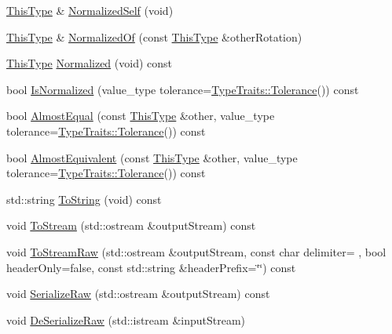 \begin{DoxyCompactItemize}
\hyperlink{classvct_axis_angle_rotation3_af654a8037b7b82a378f69cb1bfd9b8dd}{This\+Type} \& \hyperlink{classvct_axis_angle_rotation3_a37ddf9e48a259ffbf6f1beddcadf2aed}{Normalized\+Self} (void)
\item 
\hyperlink{classvct_axis_angle_rotation3_af654a8037b7b82a378f69cb1bfd9b8dd}{This\+Type} \& \hyperlink{classvct_axis_angle_rotation3_a9ab57a20a5831e8a46abf161e89d9e05}{Normalized\+Of} (const \hyperlink{classvct_axis_angle_rotation3_af654a8037b7b82a378f69cb1bfd9b8dd}{This\+Type} \&other\+Rotation)
\item 
\hyperlink{classvct_axis_angle_rotation3_af654a8037b7b82a378f69cb1bfd9b8dd}{This\+Type} \hyperlink{classvct_axis_angle_rotation3_a116569ba3bfefa865eaa77f47e437a4f}{Normalized} (void) const 
\item 
bool \hyperlink{classvct_axis_angle_rotation3_a8ce58b2c95cf2abbb6e4244c5837f46d}{Is\+Normalized} (value\+\_\+type tolerance=\hyperlink{classcmn_type_traits_adc129bf9867295b90d300768b780fa99}{Type\+Traits\+::\+Tolerance}()) const 
\item 
bool \hyperlink{classvct_axis_angle_rotation3_a1551351754cb3255404e61e04828d5e0}{Almost\+Equal} (const \hyperlink{classvct_axis_angle_rotation3_af654a8037b7b82a378f69cb1bfd9b8dd}{This\+Type} \&other, value\+\_\+type tolerance=\hyperlink{classcmn_type_traits_adc129bf9867295b90d300768b780fa99}{Type\+Traits\+::\+Tolerance}()) const 
\item 
bool \hyperlink{classvct_axis_angle_rotation3_af333432bd09bebbce7334e23d9e0d637}{Almost\+Equivalent} (const \hyperlink{classvct_axis_angle_rotation3_af654a8037b7b82a378f69cb1bfd9b8dd}{This\+Type} \&other, value\+\_\+type tolerance=\hyperlink{classcmn_type_traits_adc129bf9867295b90d300768b780fa99}{Type\+Traits\+::\+Tolerance}()) const 
\item 
std\+::string \hyperlink{classvct_axis_angle_rotation3_a21face93472a7d62f8f9065d609cfe32}{To\+String} (void) const 
\item 
void \hyperlink{classvct_axis_angle_rotation3_acbda7447118bc35acbb77b0de1c4cfa7}{To\+Stream} (std\+::ostream \&output\+Stream) const 
\item 
void \hyperlink{classvct_axis_angle_rotation3_a19187b14336ba6721c158f42a8eeee0e}{To\+Stream\+Raw} (std\+::ostream \&output\+Stream, const char delimiter= \textquotesingle{} \textquotesingle{}, bool header\+Only=false, const std\+::string \&header\+Prefix=\char`\"{}\char`\"{}) const 
\item 
void \hyperlink{classvct_axis_angle_rotation3_a9ae280f8e1ea64146875bc7ab4d9648f}{Serialize\+Raw} (std\+::ostream \&output\+Stream) const 
\item 
void \hyperlink{classvct_axis_angle_rotation3_a1365204e692b40572f0996a38551c2c3}{De\+Serialize\+Raw} (std\+::istream \&input\+Stream)
\end{DoxyCompactItemize}
